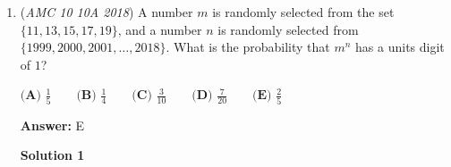 \begin{enumerate}
 



\textbf{Solution 14( , DON'T USE IN ACTUAL MATH COMP)}

There are $3^8$ choices which equals $6561$ and just by intuition kind of, we divide that by two and surprisingly, it equals $3280.5$ and the closes answer choice is $\boxed{\textbf{(D) }3281}$.

 Methods used:

 by Iris

 Edit by TheCalcGuy: this is similar to solution 10, but just a $\textit{tiny}$ bit (a lot) more risky.

 


	\item (\textit{AMC 10 10A 2018}) A number $m$ is randomly selected from the set $\{11,13,15,17,19\}$, and a number $n$ is randomly selected from $\{1999,2000,2001,\ldots,2018\}$. What is the probability that $m^n$ has a units digit of $1$?


 $\textbf{(A) }   \frac{1}{5}   \qquad        \textbf{(B) }   \frac{1}{4}   \qquad    \textbf{(C) }   \frac{3}{10}   \qquad   \textbf{(D) } \frac{7}{20} \qquad  \textbf{(E) }   \frac{2}{5}$

 \textbf{Answer: }E



\textbf{Solution 1}


\end{enumerate}
